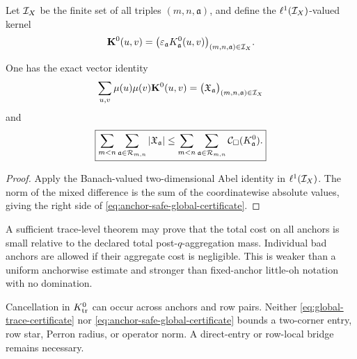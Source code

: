Let \(\mathcal I_X\) be the finite set of all triples
\((m,n,\mathfrak a)\), and define the \(\ell^1(\mathcal I_X)\)-valued kernel
\begin{equation}
 \mathbf K^{0}(u,v)
 =
 \bigl(
 \varepsilon_{\mathfrak a}K_{\mathfrak a}^{0}(u,v)
 \bigr)_{(m,n,\mathfrak a)\in\mathcal I_X}.
 \label{eq:anchor-labelled-kernel}
\end{equation}

\begin{proposition}
\label{prop:anchor-safe-certificate}
One has the exact vector identity
\[
 \sum_{u,v}\mu(u)\mu(v)\mathbf K^{0}(u,v)
 =
 \bigl(\mathfrak X_{\mathfrak a}\bigr)_{(m,n,\mathfrak a)\in\mathcal I_X}
\]
and
\begin{equation}
 \boxed{
 \sum_{m<n}\sum_{\mathfrak a\in\mathcal R_{m,n}}
 |\mathfrak X_{\mathfrak a}|
 \le
 \sum_{m<n}\sum_{\mathfrak a\in\mathcal R_{m,n}}
 \mathcal C_\square(K_{\mathfrak a}^{0}).}
 \label{eq:anchor-safe-global-certificate}
\end{equation}
\end{proposition}

\begin{proof}
Apply the Banach-valued two-dimensional Abel identity in
\(\ell^1(\mathcal I_X)\).  The norm of the mixed difference is the sum of the
coordinatewise absolute values, giving the right side of
\eqref{eq:anchor-safe-global-certificate}.
\end{proof}

\begin{remark}
A sufficient trace-level theorem may prove that the total cost on all
anchors is small relative to the declared total post-\(q\)-aggregation
mass.  Individual bad anchors are allowed if their aggregate cost is
negligible.  This is weaker than a uniform anchorwise estimate and stronger
than fixed-anchor little-oh notation with no domination.
\end{remark}

\begin{remark}
Cancellation in \(K_{\rm tr}^{0}\) can occur across anchors and row pairs.
Neither \eqref{eq:global-trace-certificate} nor
\eqref{eq:anchor-safe-global-certificate} bounds a two-corner entry, row
star, Perron radius, or operator norm.  A direct-entry or row-local bridge
remains necessary.
\end{remark}
